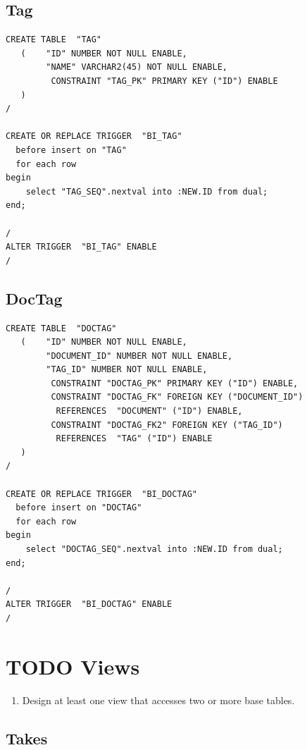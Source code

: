 \documentclass[11pt]{article}
\begin{document}
\subsection{Tag}
\label{sec-4-9}



\begin{verbatim}
CREATE TABLE  "TAG" 
   (    "ID" NUMBER NOT NULL ENABLE, 
        "NAME" VARCHAR2(45) NOT NULL ENABLE, 
         CONSTRAINT "TAG_PK" PRIMARY KEY ("ID") ENABLE
   )
/

CREATE OR REPLACE TRIGGER  "BI_TAG" 
  before insert on "TAG"               
  for each row  
begin   
    select "TAG_SEQ".nextval into :NEW.ID from dual; 
end; 

/
ALTER TRIGGER  "BI_TAG" ENABLE
/
\end{verbatim}
\subsection{DocTag}
\label{sec-4-10}



\begin{verbatim}
CREATE TABLE  "DOCTAG" 
   (    "ID" NUMBER NOT NULL ENABLE, 
        "DOCUMENT_ID" NUMBER NOT NULL ENABLE, 
        "TAG_ID" NUMBER NOT NULL ENABLE, 
         CONSTRAINT "DOCTAG_PK" PRIMARY KEY ("ID") ENABLE, 
         CONSTRAINT "DOCTAG_FK" FOREIGN KEY ("DOCUMENT_ID")
          REFERENCES  "DOCUMENT" ("ID") ENABLE, 
         CONSTRAINT "DOCTAG_FK2" FOREIGN KEY ("TAG_ID")
          REFERENCES  "TAG" ("ID") ENABLE
   )
/

CREATE OR REPLACE TRIGGER  "BI_DOCTAG" 
  before insert on "DOCTAG"               
  for each row  
begin   
    select "DOCTAG_SEQ".nextval into :NEW.ID from dual; 
end; 

/
ALTER TRIGGER  "BI_DOCTAG" ENABLE
/
\end{verbatim}
\section{\textbf{TODO} Views}
\label{sec-5}


\begin{enumerate}
\item Design at least one view that accesses two or more base tables.
\end{enumerate}
\subsection{Takes}
\label{sec-5-1}
\end{document}
